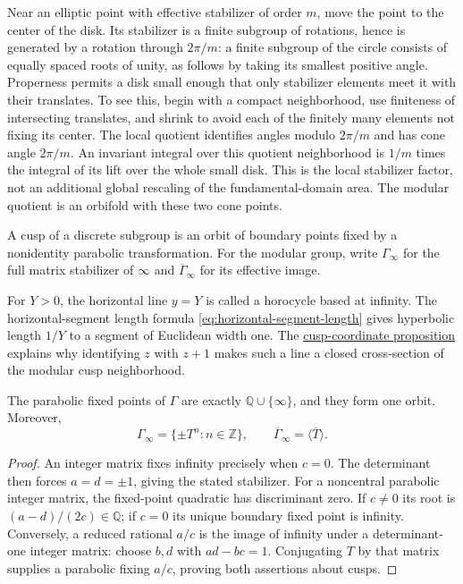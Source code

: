 \begin{remark}\label{modular.orbifold}
Near an elliptic point with effective stabilizer of order $m$, move the point to the center of the disk. Its stabilizer is a finite subgroup of rotations, hence is generated by a rotation through $2\pi/m$: a finite subgroup of the circle consists of equally spaced roots of unity, as follows by taking its smallest positive angle. Properness permits a disk small enough that only stabilizer elements meet it with their translates. To see this, begin with a compact neighborhood, use finiteness of intersecting translates, and shrink to avoid each of the finitely many elements not fixing its center. The local quotient identifies angles modulo $2\pi/m$ and has cone angle $2\pi/m$. An invariant integral over this quotient neighborhood is $1/m$ times the integral of its lift over the whole small disk. This is the local stabilizer factor, not an additional global rescaling of the fundamental-domain area. The modular quotient is an orbifold with these two cone points.
\end{remark}

\begin{definition}\label{modular.cusps}
A cusp of a discrete subgroup is an orbit of boundary points fixed by a nonidentity parabolic transformation. For the modular group, write $\Gamma_\infty$ for the full matrix stabilizer of $\infty$ and $\overline\Gamma_\infty$ for its effective image.
\end{definition}

\label{modular.horocycle}
For $Y>0$, the horizontal line $y=Y$ is called a horocycle based at infinity. The horizontal-segment length formula \eqref{eq:horizontal-segment-length} gives hyperbolic length $1/Y$ to a segment of Euclidean width one. The \hyperref[modular.cusp-coordinate]{cusp-coordinate proposition} explains why identifying $z$ with $z+1$ makes such a line a closed cross-section of the modular cusp neighborhood.

\begin{proposition}\label{modular.cusp-stabilizer}
The parabolic fixed points of $\Gamma$ are exactly $\mathbb Q\cup\{\infty\}$, and they form one orbit. Moreover,
\[
 \Gamma_\infty=\{\pm T^n:n\in\mathbb Z\},\qquad
 \overline\Gamma_\infty=\langle\overline T\rangle.
\]
\end{proposition}

\begin{proof}
An integer matrix fixes infinity precisely when $c=0$. The determinant then forces $a=d=\pm1$, giving the stated stabilizer. For a noncentral parabolic integer matrix, the fixed-point quadratic has discriminant zero. If $c\ne0$ its root is $(a-d)/(2c)\in\mathbb Q$; if $c=0$ its unique boundary fixed point is infinity. Conversely, a reduced rational $a/c$ is the image of infinity under a determinant-one integer matrix: choose $b,d$ with $ad-bc=1$. Conjugating $T$ by that matrix supplies a parabolic fixing $a/c$, proving both assertions about cusps.
\end{proof}

